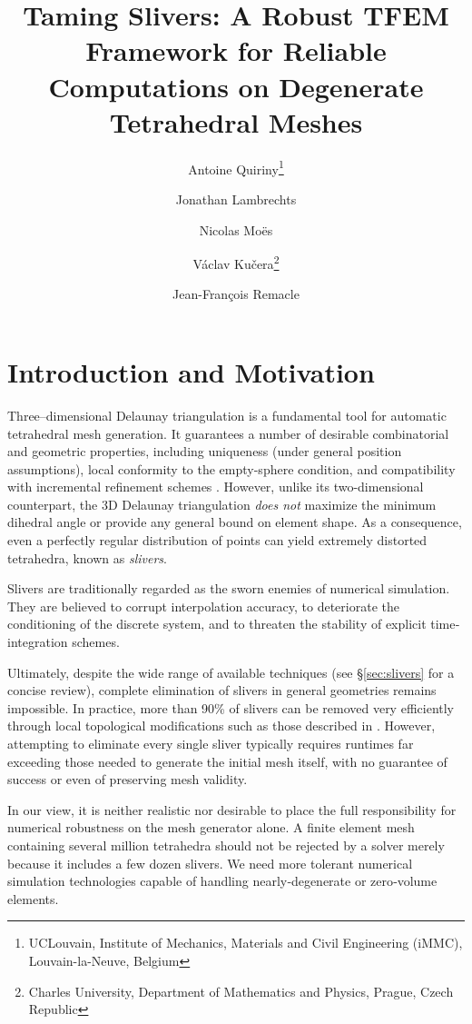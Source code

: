 \documentclass{article}
\title{Taming Slivers: A Robust TFEM Framework for Reliable Computations on Degenerate Tetrahedral Meshes}
\author{
Antoine Quiriny\thanks{UCLouvain, Institute of Mechanics, Materials and Civil Engineering (iMMC), Louvain-la-Neuve, Belgium}
\and
Jonathan Lambrechts\footnotemark[1]
\and
Nicolas Mo\"es\footnotemark[1]
\and
V\'aclav Ku\v{c}era\thanks{Charles University, Department of Mathematics and Physics, Prague, Czech Republic}
\and
Jean-Fran\c{c}ois Remacle\footnotemark[1]
}
\begin{document}
\maketitle

\section{Introduction and Motivation}
\label{sec:intro}

Three–dimensional Delaunay triangulation is a fundamental tool for automatic tetrahedral mesh generation.
It guarantees a number of desirable combinatorial and geometric properties, including uniqueness (under general position assumptions), local conformity to the empty-sphere condition, and compatibility with incremental refinement schemes \cite{Shewchuk1998_TetrahedralMeshGeneration}.
However, unlike its two-dimensional counterpart, the 3D Delaunay triangulation \emph{does not} maximize the minimum dihedral angle or provide any general bound on element shape.
As a consequence, even a perfectly regular distribution of points can yield extremely distorted tetrahedra, known as \emph{slivers}.

Slivers are traditionally regarded as the sworn enemies of numerical simulation.
They are believed to corrupt interpolation accuracy, to deteriorate the conditioning of the discrete system, and to threaten the stability of explicit time‐integration schemes.


Ultimately, despite the wide range of available techniques (see \S \ref{sec:slivers} for a concise review), complete elimination of slivers in general geometries remains impossible.
In practice, more than 90\% of slivers can be removed very efficiently through local topological modifications such as those described in \cite{FreitagOllivierGooch1997_MeshImprovement}.
However, attempting to eliminate every single sliver typically requires runtimes far exceeding those needed to generate the initial mesh itself, with no guarantee of success or even of preserving mesh validity.

In our view, it is neither realistic nor desirable to place the full responsibility for numerical robustness on the mesh generator alone.
A finite element mesh containing several million tetrahedra should not be rejected by a solver merely because it includes a few dozen slivers.
We need more tolerant numerical simulation technologies capable of handling nearly‐degenerate or zero‐volume elements.
\end{document}
